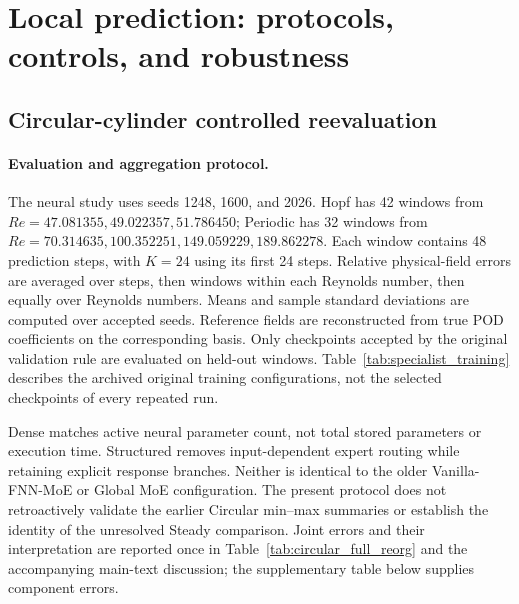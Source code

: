 \section{Local prediction: protocols, controls, and robustness}
\label{app:local_evidence}

\subsection{Circular-cylinder controlled reevaluation}
\label{app:circular}

\paragraph{Evaluation and aggregation protocol.}
The neural study uses seeds 1248, 1600, and 2026.
Hopf has 42 windows from
$Re=47.081355,49.022357,51.786450$; Periodic has 32 windows from
$Re=70.314635,100.352251,149.059229,189.862278$.
Each window contains 48 prediction steps, with $K=24$ using its
first 24 steps. Relative physical-field errors are averaged over
steps, then windows within each Reynolds number, then equally over
Reynolds numbers. Means and sample standard deviations are computed
over accepted seeds. Reference fields are reconstructed from true
POD coefficients on the corresponding basis.
Only checkpoints accepted by the original validation rule are
evaluated on held-out windows.
Table~\ref{tab:specialist_training} describes the archived original
training configurations, not the selected checkpoints of every
repeated run.

Dense matches active neural parameter count, not total stored
parameters or execution time. Structured removes input-dependent
expert routing while retaining explicit response branches.
Neither is identical to the older Vanilla-FNN-MoE or Global MoE
configuration. The present protocol does not retroactively validate
the earlier Circular min--max summaries or establish the identity
of the unresolved Steady comparison.
Joint errors and their interpretation are reported once in
Table~\ref{tab:circular_full_reorg} and the accompanying main-text
discussion; the supplementary table below supplies component errors.

